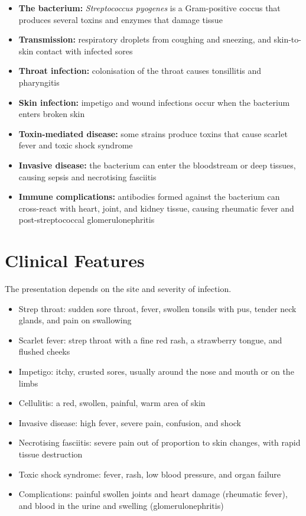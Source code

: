 \begin{itemize}
    \item \textbf{The bacterium:} \textit{Streptococcus pyogenes} is a Gram-positive coccus that produces several toxins and enzymes that damage tissue
    \item \textbf{Transmission:} respiratory droplets from coughing and sneezing, and skin-to-skin contact with infected sores
    \item \textbf{Throat infection:} colonisation of the throat causes tonsillitis and pharyngitis
    \item \textbf{Skin infection:} impetigo and wound infections occur when the bacterium enters broken skin
    \item \textbf{Toxin-mediated disease:} some strains produce toxins that cause scarlet fever and toxic shock syndrome
    \item \textbf{Invasive disease:} the bacterium can enter the bloodstream or deep tissues, causing sepsis and necrotising fasciitis
    \item \textbf{Immune complications:} antibodies formed against the bacterium can cross-react with heart, joint, and kidney tissue, causing rheumatic fever and post-streptococcal glomerulonephritis
\end{itemize}

\section*{Clinical Features}
The presentation depends on the site and severity of infection.

\begin{itemize}
    \item Strep throat: sudden sore throat, fever, swollen tonsils with pus, tender neck glands, and pain on swallowing
    \item Scarlet fever: strep throat with a fine red rash, a strawberry tongue, and flushed cheeks
    \item Impetigo: itchy, crusted sores, usually around the nose and mouth or on the limbs
    \item Cellulitis: a red, swollen, painful, warm area of skin
    \item Invasive disease: high fever, severe pain, confusion, and shock
    \item Necrotising fasciitis: severe pain out of proportion to skin changes, with rapid tissue destruction
    \item Toxic shock syndrome: fever, rash, low blood pressure, and organ failure
    \item Complications: painful swollen joints and heart damage (rheumatic fever), and blood in the urine and swelling (glomerulonephritis)
\end{itemize}

